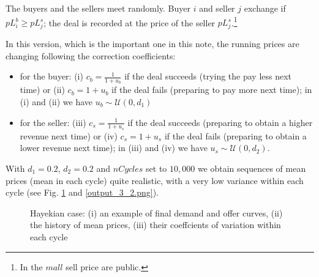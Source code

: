 \documentclass[12pt]{report}
\begin{document}
The buyers and the sellers meet randomly. Buyer $i$ and seller $j$ exchange if  $pL^b_i \geq pL^s_j$; the deal is recorded at the price of the seller $pL^s_j$.\footnote{In the $mall$ sell price are public.}

In this version, which is the important one in this note, the running prices are changing following the correction coefficients:

\begin{itemize}
\item for the buyer: (i) $c_b=\frac{1} {1 + u_b}$ if the deal succeeds (trying the pay less next time) or (ii) $c_b=1 + u_b$ if the deal fails (preparing to pay more next time); in (i) and (ii) we have $u_b\sim\mathcal{U}(0,d_1)$

\item for the seller: (iii) $c_s=\frac{1} {1 + u_s}$ if the deal succeeds (preparing to obtain a higher revenue next time) or (iv) $c_s=1 + u_s$ if the deal fails (preparing to obtain a lower revenue next time); in (iii) and (iv) we have $u_s\sim\mathcal{U}(0,d_2)$.
\end{itemize}

With $d_1=0.2$, $d_2=0.2$ and $nCycles$ set to $10,000$ we obtain sequences of mean prices (mean in each cycle) quite realistic, with a very low variance within each cycle (see Fig. \ref{output_3_1.png} and \ref{output_3_2.png}).

\begin{figure}[htbp]
\begin{center}
\caption{Hayekian case: (i) an example of final demand and offer curves, (ii) the history of mean prices, (iii) their coeffcients of variation within each cycle}
\label{output_3_1.png}
\end{center}
\end{figure}
\end{document}
